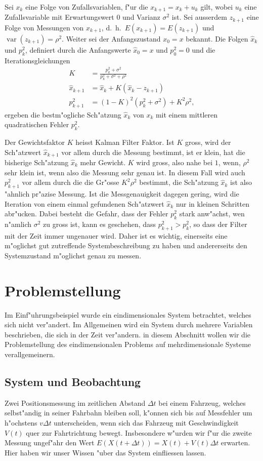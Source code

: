 \begin{satz}
Sei $x_k$ eine Folge von Zufallsvariablen, f"ur die $x_{k+1}=x_k+u_k$ gilt, wobei
$u_k$ eine Zufallsvariable mit Erwartungswert $0$ und Varianz $\sigma^2$ ist. Sei
ausserdem $z_{k+1}$ eine Folge von Messungen von $x_{k+1}$, d.~h.~$E(x_{k+1})=E(z_{k+1})$
und $\operatorname{var}(z_{k+1})=\rho^2$. Weiter sei der Anfangszustand $x_0=x$ bekannt.
Die Folgen $\hat x_k$ und $p_k^2$, definiert durch die Anfangswerte
$\hat x_0=x$ und $p_0^2=0$ und die Iterationsgleichungen
\begin{align*}
K&=\frac{p_k^2+\sigma^2}{p_k^2+\sigma^2+\rho^2}\\
\hat x_{k+1}&=\hat x_k + K (\hat x_k-z_{k+1})\\
p_{k+1}^2&=(1-K)^2(p_k^2+\sigma^2)+K^2\rho^2,
\end{align*}
ergeben die bestm"ogliche Sch"atzung $\hat x_k$ von $x_k$ mit
einem mittleren quadratischen Fehler $p_k^2$.
\end{satz}
Der Gewichtsfaktor $K$ heisst Kalman Filter Faktor. Ist $K$ gross, wird der
Sch"atzwert $\hat x_{k+1}$ vor allem durch die Messung bestimmt, ist er
klein, hat die bisherige Sch"atzung $\hat x_k$ mehr Gewicht. $K$ wird gross,
also nahe bei $1$, wenn, $\rho^2$ sehr klein ist, wenn also die Messung
sehr genau ist. In diesem Fall wird auch $p_{k+1}^2$ vor allem durch die
die Gr"osse $K^2\rho^2$ bestimmt, die Sch"atzung $\hat x_k$  ist also
"ahnlich pr"azise Messung. Ist die Messgenauigkeit dagegen gering,
wird die Iteration von einem einmal gefundenen Sch"atzwert $\hat x_k$
nur in kleinen Schritten abr"ucken. Dabei besteht die Gefahr, dass
der Fehler $p_k^2$ stark anw"achst, wen n"amlich $\sigma^2$ zu gross
ist, kann es geschehen, dass $p_{k+1}^2>p_{k}^2$, so dass der Filter
mit der Zeit immer ungenauer wird. Daher ist es wichtig, einerseits
eine m"oglichst gut zutreffende Systembeschreibung zu haben und andererseits
den Systemzustand m"oglichst genau zu messen.

\section{Problemstellung}
Im Einf"uhrungsbeispiel wurde ein eindimensionales System betrachtet,
welches sich nicht ver"andert. Im Allgemeinen wird ein System durch
mehrere Variablen beschrieben, die sich in der Zeit ver"andern.
in diesem Abschnitt wollen wir die Problemstellung des eindimensionalen
Problems auf mehrdimensionale Systeme verallgemeinern.

\subsection{System und Beobachtung}
Zwei Positionsmessung im zeitlichen Abstand $\Delta t$
bei einem Fahrzeug, welches selbst"andig
in seiner Fahrbahn bleiben soll, k"onnen sich bis auf Messfehler um h"ochstens
$v\Delta t$ unterscheiden, wenn sich das Fahrzeug mit Geschwindigkeit $V(t)$
quer zur Fahrtrichtung bewegt. Insbesondere w"urden wir f"ur die zweite
Messung ungef"ahr den Wert $E(X(t+\Delta t)) = X(t) + V(t)\Delta t$
erwarten. Hier haben wir unser Wissen "uber das System einfliessen lassen.

